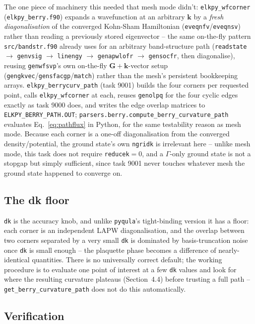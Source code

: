 \documentclass[11pt]{article}
\begin{document}
The one piece of machinery this needed that mesh mode didn't: \texttt{elkpy\_wfcorner}
(\texttt{elkpy\_berry.f90}) expands a wavefunction at an arbitrary $\mathbf k$ by a
\emph{fresh diagonalisation} of the converged Kohn-Sham Hamiltonian
(\texttt{eveqnfv}/\texttt{eveqnsv}) rather than reading a previously stored eigenvector
-- the same on-the-fly pattern \texttt{src/bandstr.f90} already uses for an arbitrary
band-structure path (\texttt{readstate} $\to$ \texttt{genvsig} $\to$ \texttt{linengy}
$\to$ \texttt{genapwlofr} $\to$ \texttt{gensocfr}, then diagonalise), reusing
\texttt{genwfsvp}'s own on-the-fly $\mathbf G+\mathbf k$-vector setup
(\texttt{gengkvec}/\texttt{gensfacgp}/\texttt{match}) rather than the mesh's persistent
bookkeeping arrays. \texttt{elkpy\_berrycurv\_path} (task 9001) builds the four corners
per requested point, calls \texttt{elkpy\_wfcorner} at each, reuses \texttt{genolpq} for
the four cyclic edges exactly as task 9000 does, and writes the edge overlap matrices to
\texttt{ELKPY\_BERRY\_PATH.OUT}; \texttt{parsers.berry.compute\_berry\_curvature\_path}
evaluates Eq.~\eqref{eq:pathflux} in Python, for the same testability reason as mesh
mode. Because each corner is a one-off diagonalisation from the converged
density/potential, the ground state's own \texttt{ngridk} is irrelevant here -- unlike
mesh mode, this task does not require \texttt{reducek}$=0$, and a $\Gamma$-only ground
state is not a stopgap but simply sufficient, since task 9001 never touches whatever
mesh the ground state happened to converge on.

\subsection{The dk floor}

\texttt{dk} is the accuracy knob, and unlike \texttt{pyqula}'s tight-binding version it
has a floor: each corner is an independent LAPW diagonalisation, and the overlap between
two corners separated by a very small \texttt{dk} is dominated by basis-truncation noise
once \texttt{dk} is small enough -- the plaquette phase becomes a difference of
nearly-identical quantities. There is no universally correct default; the working
procedure is to evaluate one point of interest at a few \texttt{dk} values and look for
where the resulting curvature plateaus (Section~4.4) before trusting a full path --
\texttt{get\_berry\_curvature\_path} does not do this automatically.

\subsection{Verification}
\end{document}
